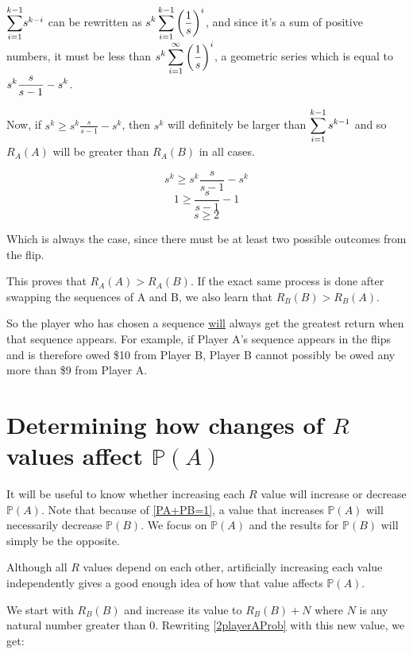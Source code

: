 \documentclass[english,12pt,a4paper,final]{article}
\begin{document}
$\mathlarger\sum_{i=1}^{k-1}s^{k-i}$ can be rewritten as
$\mathlarger{s^k \sum_{i=1}^{k-1}\left(\frac{1}{s}\right)^i}$, and since it's a sum of positive numbers, it must be less than $\mathlarger{s^k\sum_{i=1}^{\infty}\left(\frac{1}{s}\right)^i}$, a geometric series which is equal to $\mathlarger{s^k\frac{s}{s-1} - s^k}$.

Now, if $s^k \ge s^k\frac{s}{s-1} - s^k$, then $s^k$ will definitely be larger than $\mathlarger{\sum_{i=1}^{k-1}s^{k-1}}$ and so $R_A(A)$ will be greater than $R_A(B)$ in all cases.

\begin{equation*}
	s^k \ge s^k\frac{s}{s-1} - s^k
\end{equation*}
\begin{equation*}
	1 \ge \frac{s}{s-1} - 1
\end{equation*}
\begin{equation*}
	s \ge 2
\end{equation*}

Which is always the case, since there must be at least two possible outcomes from the flip.

This proves that ${R_A(A) > R_A(B)}$. If the exact same process is done after swapping the sequences of A and B, we also learn that $R_B(B)>R_B(A)$.

So the player who has chosen a sequence \underline{will} always get the greatest return when that sequence appears. For example, if Player A's sequence appears in the flips and is therefore owed \$10 from Player B, Player B cannot possibly be owed any more than \$9 from Player A.

\section{Determining how changes of $R$ values affect $\mathbb{P}(A)$}

It will be useful to know whether increasing each $R$ value will increase or decrease $\mathbb{P}(A)$. Note that because of \eqref{PA+PB=1}, a value that increases $\mathbb{P}(A)$ will necessarily decrease $\mathbb{P}(B)$. We focus on $\mathbb{P}(A)$ and the results for $\mathbb{P}(B)$ will simply be the opposite.

Although all $R$ values depend on each other, artificially increasing each value independently gives a good enough idea of how that value affects $\mathbb{P}(A)$.

We start with $R_B(B)$ and increase its value to $R_B(B) + N$ where $N$ is any natural number greater than 0. Rewriting \eqref{2playerAProb} with this new value, we get:
\end{document}
